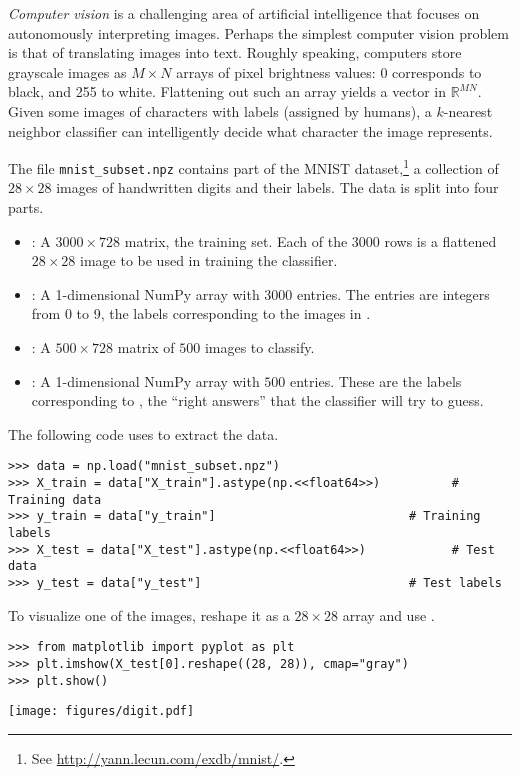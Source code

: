 \emph{Computer vision} is a challenging area of artificial intelligence that focuses on autonomously interpreting images.
Perhaps the simplest computer vision problem is that of translating images into text.
Roughly speaking, computers store grayscale images as $M \times N$ arrays of pixel brightness values: 0 corresponds to black, and 255 to white.
Flattening out such an array yields a vector in $\mathbb{R}^{MN}$.
Given some images of characters with labels (assigned by humans), a $k$-nearest neighbor classifier can intelligently decide what character the image represents.

\begin{problem}
The file \texttt{mnist\_subset.npz} contains part of the MNIST dataset,\footnote{See \url{http://yann.lecun.com/exdb/mnist/}.} a collection of $28\times 28$ images of handwritten digits and their labels.
The data is split into four parts.
\begin{itemize}
\item {}: A $3000\times 728$ matrix, the training set.
Each of the $3000$ rows is a flattened $28\times 28$ image to be used in training the classifier.

\item {}: A 1-dimensional NumPy array with $3000$ entries.
The entries are integers from 0 to 9, the labels corresponding to the images in .

\item {}: A $500\times 728$ matrix of $500$ images to classify.

\item {}: A 1-dimensional NumPy array with $500$ entries.
These are the labels corresponding to , the ``right answers'' that the classifier will try to guess.
\end{itemize}
The following code uses  to extract the data.
\begin{lstlisting}
>>> data = np.load("mnist_subset.npz")
>>> X_train = data["X_train"].astype(np.<<float64>>)          # Training data
>>> y_train = data["y_train"]                           # Training labels
>>> X_test = data["X_test"].astype(np.<<float64>>)            # Test data
>>> y_test = data["y_test"]                             # Test labels
\end{lstlisting}
To visualize one of the images, reshape it as a $28\times 28$ array and use .
\begin{lstlisting}
>>> from matplotlib import pyplot as plt
>>> plt.imshow(X_test[0].reshape((28, 28)), cmap="gray")
>>> plt.show()
\end{lstlisting}
\begin{center}
\texttt{[image: figures/digit.pdf]}
\end{center}


\end{problem}
